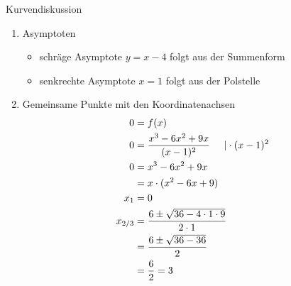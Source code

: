 \begin{bsp}{Kurvendiskussion}{}
\begin{enumerate}
\begin{enumerate}
      \begin{equation*}
    \begin{split}
        \lim_{x\longrightarrow -\infty} f(x) &= \lim_{x\longrightarrow -\infty} \dfrac{x^3-6x^2+9x}{(x-1)^2} \\
         &= \lim_{x\longrightarrow -\infty}  x-4+\dfrac{4}{(x-1)^2}\\
         &= -\infty
    \end{split}
\end{equation*}
\item Verhalten an der Definitionslücke
      \begin{equation*}
    \begin{split}
        \lim_{x\longrightarrow 1^-} f(x) &= \lim_{x\longrightarrow 1^-} \dfrac{x^3-6x^2+9x}{(x-1)^2} \\
         &= \infty\\
         \lim_{x\longrightarrow 1^+} f(x) &= \lim_{x\longrightarrow 1^+} \dfrac{x^3-6x^2+9x}{(x-1)^2} \\
         &= \infty
    \end{split}
\end{equation*}
Daraus folgt, dass an der Stelle $x=1$ eine Polstelle (Unendlichkeitsstelle) ohne Vorzeichenwechsel (VZW) vorliegt.
 \end{enumerate}
 \item Asymptoten
 \begin{itemize}
     \item schräge Asymptote $y= x-4$ folgt aus der Summenform
     \item senkrechte Asymptote $x=1$ folgt aus der Polstelle
 \end{itemize}
 \item Gemeinsame Punkte mit den Koordinatenachsen
 \begin{equation*}
    \begin{split}
        0 &= f(x)\\
         0 &= \dfrac{x^3-6x^2+9x}{(x-1)^2} \hspace{0.5cm} | \cdot (x-1)^2\\
         0&= x^3-6x^2+9x\\
         &= x\cdot(x^2-6x+9)\\
         x_1 &= 0\\
         x_{2/3} &= \dfrac{6\pm \sqrt{36 -4\cdot 1 \cdot 9}}{2 \cdot 1}\\
         &= \dfrac{6\pm \sqrt{36-36}}{2}\\
         &= \dfrac{6}{2} = 3
    \end{split}

\end{equation*}
\end{enumerate}
\end{bsp}
